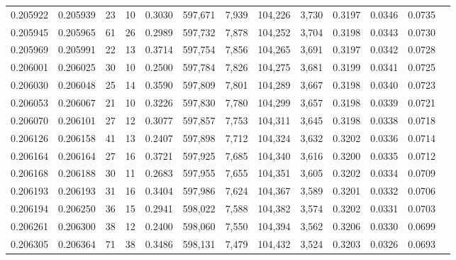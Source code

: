 \begin{tabular}{rrrrrrrrrrrrr}
0.205922 & 0.205939 &    23 &  10 &                                     0.3030 & 597,671 &   7,939 & 104,226 &   3,730 & 0.3197 & 0.0346 & 0.0735 \\
0.205945 & 0.205965 &    61 &  26 &                                     0.2989 & 597,732 &   7,878 & 104,252 &   3,704 & 0.3198 & 0.0343 & 0.0730 \\
0.205969 & 0.205991 &    22 &  13 &                                     0.3714 & 597,754 &   7,856 & 104,265 &   3,691 & 0.3197 & 0.0342 & 0.0728 \\
0.206001 & 0.206025 &    30 &  10 &                                     0.2500 & 597,784 &   7,826 & 104,275 &   3,681 & 0.3199 & 0.0341 & 0.0725 \\
0.206030 & 0.206048 &    25 &  14 &                                     0.3590 & 597,809 &   7,801 & 104,289 &   3,667 & 0.3198 & 0.0340 & 0.0723 \\
0.206053 & 0.206067 &    21 &  10 &                                     0.3226 & 597,830 &   7,780 & 104,299 &   3,657 & 0.3198 & 0.0339 & 0.0721 \\
0.206070 & 0.206101 &    27 &  12 &                                     0.3077 & 597,857 &   7,753 & 104,311 &   3,645 & 0.3198 & 0.0338 & 0.0718 \\
0.206126 & 0.206158 &    41 &  13 &                                     0.2407 & 597,898 &   7,712 & 104,324 &   3,632 & 0.3202 & 0.0336 & 0.0714 \\
0.206164 & 0.206164 &    27 &  16 &                                     0.3721 & 597,925 &   7,685 & 104,340 &   3,616 & 0.3200 & 0.0335 & 0.0712 \\
0.206168 & 0.206188 &    30 &  11 &                                     0.2683 & 597,955 &   7,655 & 104,351 &   3,605 & 0.3202 & 0.0334 & 0.0709 \\
0.206193 & 0.206193 &    31 &  16 &                                     0.3404 & 597,986 &   7,624 & 104,367 &   3,589 & 0.3201 & 0.0332 & 0.0706 \\
0.206194 & 0.206250 &    36 &  15 &                                     0.2941 & 598,022 &   7,588 & 104,382 &   3,574 & 0.3202 & 0.0331 & 0.0703 \\
0.206261 & 0.206300 &    38 &  12 &                                     0.2400 & 598,060 &   7,550 & 104,394 &   3,562 & 0.3206 & 0.0330 & 0.0699 \\
0.206305 & 0.206364 &    71 &  38 &                                     0.3486 & 598,131 &   7,479 & 104,432 &   3,524 & 0.3203 & 0.0326 & 0.0693 \\

\end{tabular}
